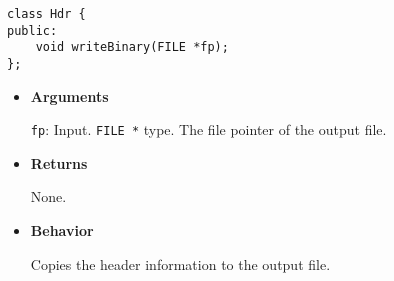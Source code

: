 \begin{screen}
\begin{verbatim}
class Hdr {
public:
    void writeBinary(FILE *fp);
};
\end{verbatim}
\end{screen}

\begin{itemize}

\item {\bf Arguments}

  \texttt{fp}: Input. \texttt{FILE *} type. The file pointer of the output file.

\item {\bf Returns}

  None.
  
\item {\bf Behavior}

  Copies the header information to the output file.
    
\end{itemize}
